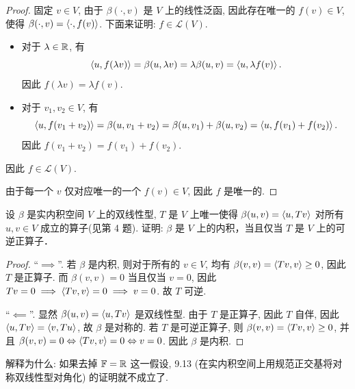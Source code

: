 \documentclass{article}
\begin{document}
\begin{proof}
  固定 \( v\in V \), 由于 \( \beta(\cdot,v) \) 是 \( V \) 上的线性泛函, 因此存在唯一的 \( f(v)\in V \), 使得 \( \beta(\cdot,v) = \left\langle \cdot, f(v) \right\rangle \). 下面来证明: \( f\in \mathcal{L}(V) \). 
  \begin{itemize}
    \item 对于 \( \lambda\in\mathbb{R} \), 有
    \[ \left\langle u, f(\lambda v) \right\rangle = \beta(u,\lambda v) = \lambda \beta(u,v) = \left\langle u, \lambda f(v) \right\rangle. \]
    因此 \( f(\lambda v) = \lambda f(v) \).
    \item 对于 \( v_1,v_2\in V \), 有
    \[ \left\langle u, f(v_1+v_2) \right\rangle = \beta(u,v_1+v_2) = \beta(u,v_1)+\beta(u,v_2) = \left\langle u, f(v_1)+f(v_2) \right\rangle. \]
    因此 \( f(v_1+v_2) = f(v_1) + f(v_2) \).
  \end{itemize}
  因此 \( f\in \mathcal{L}(V) \).

  由于每一个 \( v \) 仅对应唯一的一个 \( f(v)\in V \), 因此 \( f \) 是唯一的.
\end{proof}



\begin{problem}[9A-5]
  设 \( \beta \) 是实内积空间 \( V \) 上的双线性型, \( T \) 是 \( V \) 上唯一使得 \( \beta(u,v)=\left\langle u, Tv \right\rangle \) 对所有 \( u,v\in V \) 成立的算子(见第 4 题). 证明: \( \beta \) 是 \( V \) 上的内积，当且仅当 \( T \) 是 \( V \) 上的可逆正算子．
\end{problem}

\begin{proof}
  ``\( \implies \)''. 若 \( \beta \) 是内积, 则对于所有的 \( v\in V \), 均有 \( \beta(v,v)=\left\langle Tv, v \right\rangle \geq 0 \), 因此 \( T \) 是正算子. 而 \( \beta(v,v) = 0 \) 当且仅当 \( v=0 \), 因此 \( Tv=0 \implies \left\langle Tv, v \right\rangle=0 \implies v=0 \). 故 \( T \) 可逆.

  ``\( \impliedby \)''. 显然 \( \beta(u,v) = \left\langle u, Tv \right\rangle \) 是双线性型. 由于 \( T \) 是正算子, 因此 \( T \) 自伴, 因此 \( \left\langle u, Tv \right\rangle=\left\langle v, Tu \right\rangle \), 故 \( \beta \) 是对称的. 若 \( T \) 是可逆正算子, 则 \( \beta(v,v)=\left\langle Tv, v \right\rangle\ge 0 \), 并且 \( \beta(v,v)=0 \Leftrightarrow \left\langle Tv, v \right\rangle = 0 \Leftrightarrow v=0 \). 因此 \( \beta \) 是内积.
\end{proof}



\begin{problem}[9A-7]
  解释为什么: 如果去掉 \( \mathbb{F}=\mathbb{R} \) 这一假设, 9.13 (在实内积空间上用规范正交基将对称双线性型对角化) 的证明就不成立了.
\end{problem}
\end{document}
